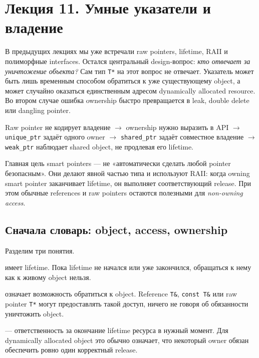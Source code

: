 \section{Лекция 11. Умные указатели и владение}
\label{sec:lecture-11}

В предыдущих лекциях мы уже встречали raw pointers, lifetime, RAII и
полиморфные interfaces. Остался центральный design-вопрос: \emph{кто отвечает
за уничтожение объекта?} Сам тип \texttt{T*} на этот вопрос не отвечает.
Указатель может быть лишь временным способом обратиться к уже существующему
object, а может случайно оказаться единственным адресом dynamically allocated
resource. Во втором случае ошибка ownership быстро превращается в leak,
double delete или dangling pointer.

\begin{importantbox}
Raw pointer не кодирует владение $\rightarrow$ ownership нужно выразить в API
$\rightarrow$ \texttt{unique\_ptr} задаёт одного owner $\rightarrow$
\texttt{shared\_ptr} задаёт совместное владение $\rightarrow$
\texttt{weak\_ptr} наблюдает shared object, не продлевая его lifetime.
\end{importantbox}

Главная цель smart pointers --- не «автоматически сделать любой pointer
безопасным». Они делают  явной частью типа и используют RAII:
когда owning smart pointer заканчивает lifetime, он выполняет соответствующий
release. При этом обычные references и raw pointers остаются полезными для
\emph{non-owning access}.

\subsection{Сначала словарь: object, access, ownership}

Разделим три понятия.

 имеет lifetime. Пока lifetime не начался или уже закончился,
обращаться к нему как к живому object нельзя.

 означает возможность обратиться к object. Reference
\texttt{T\&}, \texttt{const T\&} или raw pointer \texttt{T*} могут предоставлять
такой доступ, ничего не говоря об обязанности уничтожить object.

 --- ответственность за окончание lifetime ресурса в нужный
момент. Для dynamically allocated object это обычно означает, что некоторый
owner обязан обеспечить ровно один корректный release.

